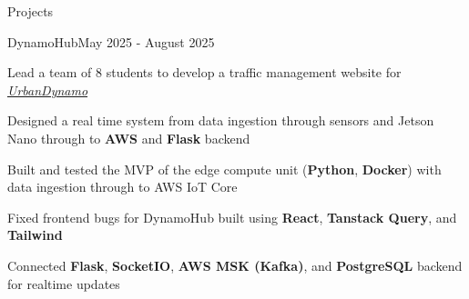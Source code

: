 \documentclass[
	11pt, %
]{resume} %
\begin{document}
\begin{rSection}{Projects}



	\begin{rSubsection}{DynamoHub}{May 2025 - August 2025}{}{}
		\item Lead a team of 8 students to develop a traffic management website for \textit{\href{https://linkedin.com/in/mnkhoi}{UrbanDynamo}}
		\item Designed a real time system from data ingestion through sensors and Jetson Nano through to \textbf{AWS} and \textbf{Flask} backend
		\item Built and tested the MVP of the edge compute unit (\textbf{Python}, \textbf{Docker}) with data ingestion through to AWS IoT Core
		\item Fixed frontend bugs for DynamoHub built using \textbf{React}, \textbf{Tanstack Query}, and \textbf{Tailwind}
		\item Connected \textbf{Flask}, \textbf{SocketIO}, \textbf{AWS MSK (Kafka)}, and \textbf{PostgreSQL} backend for realtime updates
	\end{rSubsection}

\end{rSection}

%
%
\end{document}
